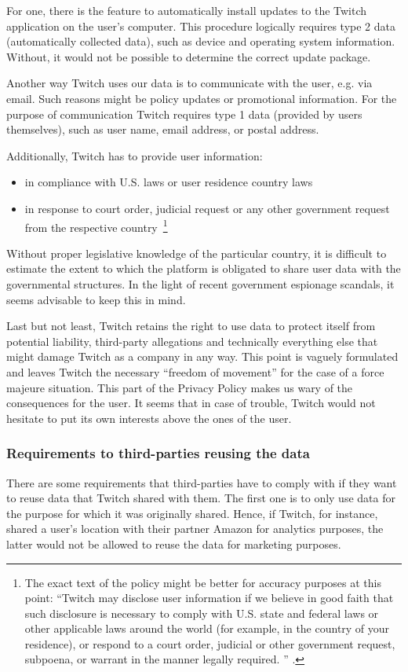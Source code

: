For one, there is the feature to automatically install updates to the Twitch application on the user's computer. This procedure logically requires type 2 data (automatically collected data), such as device and operating system information. Without, it would not be possible to determine the correct update package. 

Another way Twitch uses our data is to communicate with the user, e.g. via email. Such reasons might be policy updates or promotional information. For the purpose of communication Twitch requires type 1 data (provided by users themselves), such as user name, email address, or postal address. 

Additionally, Twitch has to provide user information: 
\begin{itemize}
	\item in compliance with U.S. laws or user residence country laws
	\item in response to court order, judicial request or any other government request from the respective country~\footnote{The exact text of the policy might be better for accuracy purposes at this point: ``Twitch may disclose user information if we believe in good faith that such disclosure is necessary to comply with U.S. state and federal laws or other applicable laws around the world (for example, in the country of your residence), or respond to a court order, judicial or other government request, subpoena, or warrant in the manner legally required. '' \cite[Section~3]{twitch-privacy-policy}.}
\end{itemize}
Without proper legislative knowledge of the particular country, it is difficult to estimate the extent to which the platform is obligated to share user data with the governmental structures. In the light of recent government espionage scandals, it seems advisable to keep this in mind. 

Last but not least, Twitch retains the right to use data to protect itself from potential liability, third-party allegations and technically everything else that might damage Twitch as a company in any way. This point is vaguely formulated and leaves Twitch the necessary ``freedom of movement'' for the case of a force majeure situation. This part of the Privacy Policy makes us wary of the consequences for the user. It seems that in case of trouble, Twitch would not hesitate to put its own interests above the ones of the user. 

\subsubsection{Requirements to third-parties reusing the data}
There are some requirements that third-parties have to comply with if they want to reuse data that Twitch shared with them. The first one is to only use data for the purpose for which it was originally shared. Hence, if Twitch, for instance, shared a user's location with their partner Amazon for analytics purposes, the latter would not be allowed to reuse the data for marketing purposes. 

